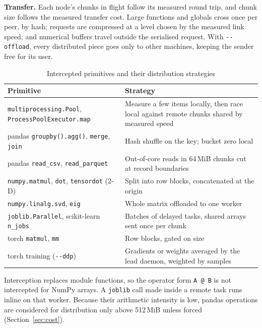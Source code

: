 \textbf{Transfer.} Each node's chunks in flight follow its measured round trip,
and chunk size follows the measured transfer cost. Large functions and globals
cross once per peer, by hash; requests are compressed at a level chosen by the
measured link speed; and numerical buffers travel outside the serialised
request. With \texttt{-{}-offload}, every distributed piece goes only to other
machines, keeping the sender free for its user.

\begin{table}[!htbp]
\centering
\caption{Intercepted primitives and their distribution strategies}
\label{tab:intercept}
\renewcommand{\arraystretch}{1.2}
\begin{tabularx}{\textwidth}{L{5.0cm} X}
\toprule
\textbf{Primitive} & \textbf{Strategy} \\
\midrule
\texttt{multiprocessing.Pool}, \texttt{ProcessPoolExecutor.map} & Measure a few items locally, then race local against remote chunks shared by measured speed \\
pandas \texttt{groupby().agg()}, \texttt{merge}, \texttt{join} & Hash shuffle on the key; bucket zero local \\
pandas \texttt{read\_csv}, \texttt{read\_parquet} & Out-of-core reads in 64\,MiB chunks cut at record boundaries \\
\texttt{numpy.matmul}, \texttt{dot}, \texttt{tensordot} (2-D) & Split into row blocks, concatenated at the origin \\
\texttt{numpy.linalg.svd}, \texttt{eig} & Whole matrix offloaded to one worker \\
\texttt{joblib.Parallel}, scikit-learn \texttt{n\_jobs} & Batches of delayed tasks, shared arrays sent once per chunk \\
torch \texttt{matmul}, \texttt{mm} & Row blocks, gated on size \\
torch training (\texttt{-{}-ddp}) & Gradients or weights averaged by the lead daemon, weighted by samples \\
\bottomrule
\end{tabularx}
\end{table}

Interception replaces module functions, so the operator form \texttt{A @ B} is
not intercepted for NumPy arrays. A \texttt{joblib} call made inside a remote
task runs inline on that worker. Because their arithmetic intensity is low,
pandas operations are considered for distribution only above 512\,MiB unless
forced (Section~\ref{sec:cost}).

